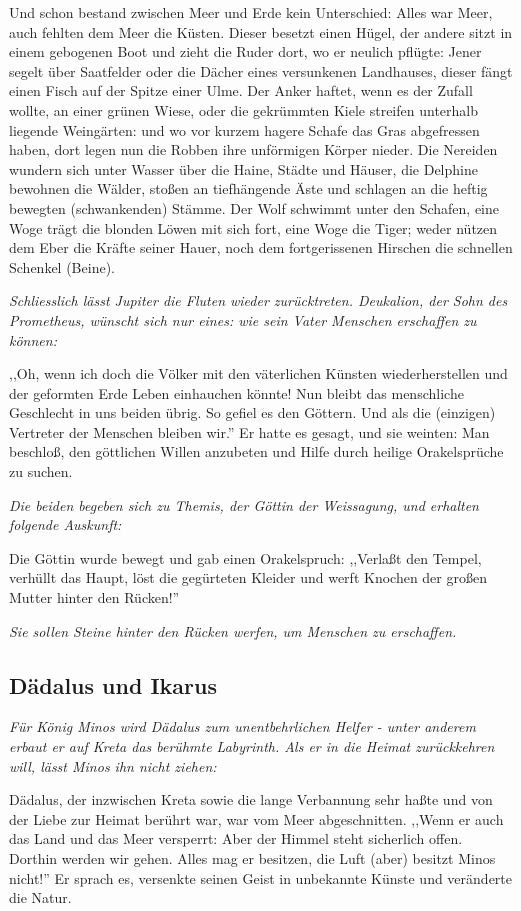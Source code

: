 \documentclass[a4paper]{article}
\begin{document}
Und schon bestand zwischen Meer und Erde kein Unterschied: Alles war Meer, auch fehlten dem Meer die Küsten. Dieser besetzt einen Hügel, der andere sitzt in einem gebogenen Boot und zieht die Ruder dort, wo er neulich pflügte: Jener segelt über Saatfelder oder die Dächer eines versunkenen Landhauses, dieser fängt einen Fisch auf der Spitze einer Ulme. Der Anker haftet, wenn es der Zufall wollte, an einer grünen Wiese, oder die gekrümmten Kiele streifen unterhalb liegende Weingärten: und wo vor kurzem hagere Schafe das Gras abgefressen haben, dort legen nun die Robben ihre unförmigen Körper nieder. Die Nereiden wundern sich unter Wasser über die Haine, Städte und Häuser, die Delphine bewohnen die Wälder, stoßen an tiefhängende Äste und schlagen an die heftig bewegten (schwankenden) Stämme. Der Wolf schwimmt unter den Schafen, eine Woge trägt die blonden Löwen mit sich fort, eine Woge die Tiger; weder nützen dem Eber die Kräfte seiner Hauer, noch dem fortgerissenen Hirschen die schnellen Schenkel (Beine).

\textit{Schliesslich lässt Jupiter die Fluten wieder zurücktreten. Deukalion, der Sohn des Prometheus, wünscht sich nur eines: wie sein Vater Menschen erschaffen zu können:}

,,Oh, wenn ich doch die Völker mit den väterlichen Künsten wiederherstellen und der geformten Erde Leben einhauchen könnte! Nun bleibt das menschliche Geschlecht in uns beiden übrig. So gefiel es den Göttern. Und als die (einzigen) Vertreter der Menschen bleiben wir.'' Er hatte es gesagt, und sie weinten: Man beschloß, den göttlichen Willen anzubeten und Hilfe durch heilige Orakelsprüche zu suchen.

\textit{Die beiden begeben sich zu Themis, der Göttin der Weissagung, und erhalten folgende Auskunft:}

Die Göttin wurde bewegt und gab einen Orakelspruch: ,,Verlaßt den Tempel, verhüllt das Haupt, löst die gegürteten Kleider und werft Knochen der großen Mutter hinter den Rücken!''

\textit{Sie sollen Steine hinter den Rücken werfen, um Menschen zu erschaffen. }
\subsection{Dädalus und Ikarus}
\textit{Für König Minos wird Dädalus zum unentbehrlichen Helfer - unter anderem erbaut er auf Kreta das berühmte Labyrinth. Als er in die Heimat zurückkehren will, lässt Minos ihn nicht ziehen: }

Dädalus, der inzwischen Kreta sowie die lange Verbannung sehr haßte und von der Liebe zur Heimat berührt war, war vom Meer abgeschnitten. ,,Wenn er auch das Land und das Meer versperrt: Aber der Himmel steht sicherlich offen. Dorthin werden wir gehen. Alles mag er besitzen, die Luft (aber) besitzt Minos nicht!'' Er sprach es, versenkte seinen Geist in unbekannte Künste und veränderte die Natur.
\end{document}
